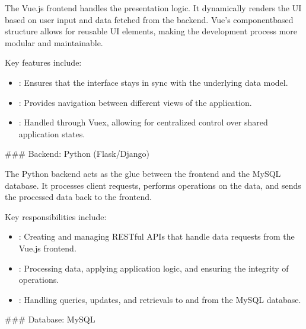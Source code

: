 \documentclass[a4paper,12pt,english]{sphinxmanual}
\begin{document}
\sphinxAtStartPar
The Vue.js front\sphinxhyphen{}end handles the presentation logic. It dynamically renders the UI based on user input and data fetched from the back\sphinxhyphen{}end. Vue’s component\sphinxhyphen{}based structure allows for reusable UI elements, making the development process more modular and maintainable.

\sphinxAtStartPar
Key features include:
\begin{itemize}
\item {} 
\sphinxAtStartPar
{}: Ensures that the interface stays in sync with the underlying data model.

\item {} 
\sphinxAtStartPar
{}: Provides navigation between different views of the application.

\item {} 
\sphinxAtStartPar
{}: Handled through Vuex, allowing for centralized control over shared application states.

\end{itemize}

\sphinxAtStartPar
\#\#\# Back\sphinxhyphen{}end: Python (Flask/Django)

\sphinxAtStartPar
The Python back\sphinxhyphen{}end acts as the glue between the front\sphinxhyphen{}end and the MySQL database. It processes client requests, performs operations on the data, and sends the processed data back to the front\sphinxhyphen{}end.

\sphinxAtStartPar
Key responsibilities include:
\begin{itemize}
\item {} 
\sphinxAtStartPar
{}: Creating and managing RESTful APIs that handle data requests from the Vue.js front\sphinxhyphen{}end.

\item {} 
\sphinxAtStartPar
{}: Processing data, applying application logic, and ensuring the integrity of operations.

\item {} 
\sphinxAtStartPar
{}: Handling queries, updates, and retrievals to and from the MySQL database.

\end{itemize}

\sphinxAtStartPar
\#\#\# Database: MySQL
\end{document}
